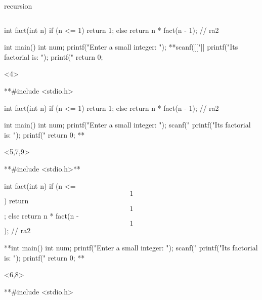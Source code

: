 \documentclass[10pt,t,svgnames]{beamer}
\begin{document}
\begin{frame}[fragile]{recursion}
\begin{columns}
\begin{column}{.65\textwidth}
\begin{scriptsize}
\begin{onlyenv}
\begin{codeblock}[gobble=8]
              int fact(int n) {
                if (n <= 1) {
                  return 1;
                }
                else {
                  return n * fact(n - 1); // ra2
                }
              }

              int main() {
                int num;
                printf("Enter a small integer: ");
                **scanf([["]]%
                printf("Its factorial is: ");
                printf("%
                return 0;
              }
            \end{codeblock}
          \end{onlyenv}
          \begin{onlyenv}<4>
            \begin{codeblock}[gobble=8]
              **#include <stdio.h>

              int fact(int n) {
                if (n <= 1) {
                  return 1;
                }
                else {
                  return n * fact(n - 1); // ra2
                }
              }

              int main() {
                int num;
                printf("Enter a small integer: ");
                scanf("%
                printf("Its factorial is: ");
                printf("%
                return 0;
              }**
            \end{codeblock}
          \end{onlyenv}
          \begin{onlyenv}<5,7,9>
            \begin{codeblock}[gobble=8]
              **#include <stdio.h>**

              int fact(int n) {
                if (n <= $$1$$) {
                  return $$1$$;
                }
                else {
                  return n * fact(n - $$1$$); // ra2
                }
              }

              **int main() {
                int num;
                printf("Enter a small integer: ");
                scanf("%
                printf("Its factorial is: ");
                printf("%
                return 0;
              }**
            \end{codeblock}
          \end{onlyenv}
          \begin{onlyenv}<6,8>
            \begin{codeblock}[gobble=8]
              **#include <stdio.h>


\end{codeblock}
\end{onlyenv}
\end{scriptsize}
\end{column}
\end{columns}
\end{frame}
\end{document}
